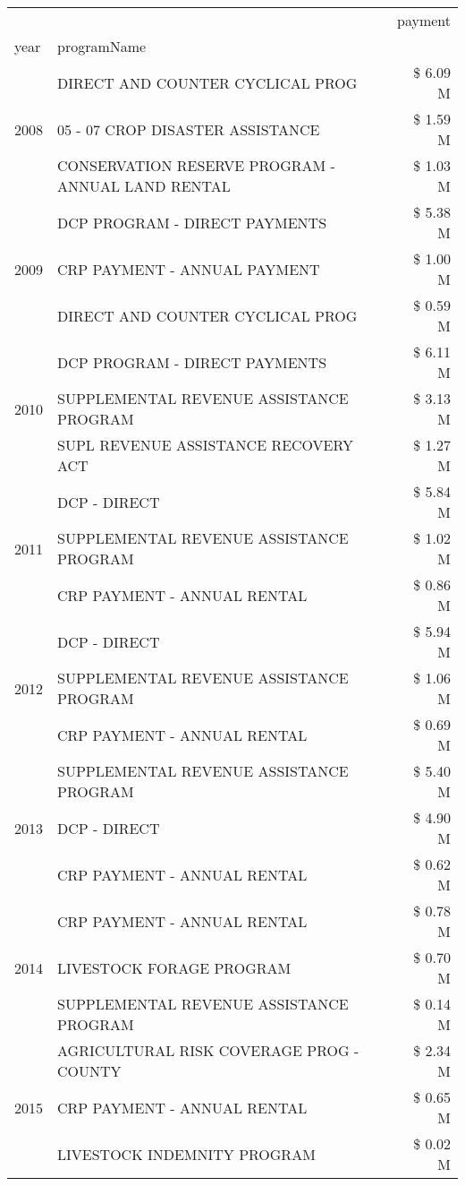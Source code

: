 \begin{tabular}{llr}
\toprule
 &  & payment \\
year & programName &  \\
\midrule
\multirow[t]{3}{*}{2008} & DIRECT AND COUNTER CYCLICAL PROG & \$ 6.09 M \\
 & 05 - 07 CROP DISASTER ASSISTANCE & \$ 1.59 M \\
 & CONSERVATION RESERVE PROGRAM - ANNUAL LAND RENTAL & \$ 1.03 M \\
\cline{1-3}
\multirow[t]{3}{*}{2009} & DCP PROGRAM - DIRECT PAYMENTS & \$ 5.38 M \\
 & CRP PAYMENT - ANNUAL PAYMENT & \$ 1.00 M \\
 & DIRECT AND COUNTER CYCLICAL PROG & \$ 0.59 M \\
\cline{1-3}
\multirow[t]{3}{*}{2010} & DCP PROGRAM - DIRECT PAYMENTS & \$ 6.11 M \\
 & SUPPLEMENTAL REVENUE ASSISTANCE PROGRAM & \$ 3.13 M \\
 & SUPL REVENUE ASSISTANCE RECOVERY ACT & \$ 1.27 M \\
\cline{1-3}
\multirow[t]{3}{*}{2011} & DCP - DIRECT & \$ 5.84 M \\
 & SUPPLEMENTAL REVENUE ASSISTANCE PROGRAM & \$ 1.02 M \\
 & CRP PAYMENT - ANNUAL RENTAL & \$ 0.86 M \\
\cline{1-3}
\multirow[t]{3}{*}{2012} & DCP - DIRECT & \$ 5.94 M \\
 & SUPPLEMENTAL REVENUE ASSISTANCE PROGRAM & \$ 1.06 M \\
 & CRP PAYMENT - ANNUAL RENTAL & \$ 0.69 M \\
\cline{1-3}
\multirow[t]{3}{*}{2013} & SUPPLEMENTAL REVENUE ASSISTANCE PROGRAM & \$ 5.40 M \\
 & DCP - DIRECT & \$ 4.90 M \\
 & CRP PAYMENT - ANNUAL RENTAL & \$ 0.62 M \\
\cline{1-3}
\multirow[t]{3}{*}{2014} & CRP PAYMENT - ANNUAL RENTAL & \$ 0.78 M \\
 & LIVESTOCK FORAGE PROGRAM & \$ 0.70 M \\
 & SUPPLEMENTAL REVENUE ASSISTANCE PROGRAM & \$ 0.14 M \\
\cline{1-3}
\multirow[t]{3}{*}{2015} & AGRICULTURAL RISK COVERAGE PROG - COUNTY & \$ 2.34 M \\
 & CRP PAYMENT - ANNUAL RENTAL & \$ 0.65 M \\
 & LIVESTOCK INDEMNITY PROGRAM & \$ 0.02 M \\

\end{tabular}
